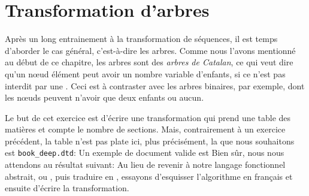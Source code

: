\section{Transformation d'arbres}

Après un long entrainement à la transformation de séquences, il est
temps d'aborder le cas général, c'est-à-dire les arbres. Comme nous
l'avons mentionné au début de ce chapitre, les arbres \XML sont des
\emph{arbres de Catalan}, ce qui veut dire qu'un nœud élément peut
avoir un nombre variable d'enfants, si ce n'est pas interdit par une
\DTD. Ceci est à contraster avec les arbres binaires, par exemple,
dont les nœuds peuvent n'avoir que deux enfants ou aucun.


Le but de cet exercice est d'écrire une transformation \XSLT qui prend
une table des matières et compte le nombre de sections. Mais,
contrairement à un exercice précédent, la table n'est pas plate ici,
plus précisément, la \DTD que nous souhaitons est \texttt{book\_deep.dtd}:
\noindent Un exemple de document \XML valide est
\noindent Bien sûr, nous nous attendons au résultat suivant:
{\small}
Au lieu de revenir à notre langage fonctionnel abstrait, ou \Erlang,
puis traduire en \XSLT, essayons d'esquisser l'algorithme en français
et ensuite d'écrire la transformation.

